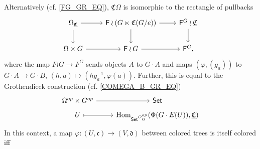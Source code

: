 \documentclass[a4paper,10pt
,draft
]{article}%
\renewcommand{\phi}{\varphi}
\newcommand{\UC}{\underline{\mathfrak C}}
\renewcommand{\1}{\ensuremath{\mathbb{id}}}
\begin{document}
\begin{remark}

      {\color{blue} %
      Alternatively (cf. \eqref{FG_GR_EQ}),
      $\UC \Omega$ is isomorphic to the rectangle of pullbacks
      \begin{equation}
            \label{COMEGA_FG_EQ}
            \begin{tikzcd}
                  \Omega_{\UC} \arrow[d] \arrow[r]
                  &
                  \mathsf F \wr (G \ltimes {\mathfrak C(G/e)}) \arrow[r] \arrow[d]
                  &
                  \mathsf F^G \wr \UC \arrow[d]
                  \\
                  \Omega \times G \arrow[r]
                  &
                  \mathsf F \wr G \arrow[r]
                  &
                  \mathsf F^G,
            \end{tikzcd}
      \end{equation}
      where the map $F \wr G \to F^G$ sends objects $A$ to $G \cdot A$ and
      maps $(\phi, (g_a))$ to $G \cdot A \to G \cdot B$, $(h, a) \mapsto (h g_a^{-1}, \phi(a))$.
      Further, this is equal to the Grothendieck construction (cf. \eqref{COMEGA_B_GR_EQ})
      \begin{equation}
            \label{COMEGA_FG_GR_EQ}
            \begin{tikzcd}[row sep = tiny]
                  \Omega^{op} \times G^{op} \arrow[r]
                  &
                  \mathsf{Set}
                  \\
                  U \arrow[r, mapsto]
                  &
                  \Hom_{\mathsf{Set}^{O_G^{op}}}(\Phi(G \cdot E(U)), \UC)
            \end{tikzcd}
      \end{equation}
      In this context, a map $\phi: (U,\mathfrak c) \to (V, \mathfrak d)$ between colored trees is itself colored iff
}
\end{remark}
\end{document}

